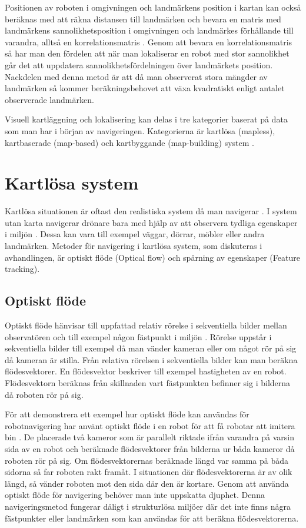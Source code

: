 Positionen av roboten i omgivningen och landmärkens position i kartan kan också beräknas med att räkna distansen till landmärken och bevara en matris med landmärkens sannolikhetsposition i omgivningen och landmärkes förhållande till varandra, alltså en korrelationsmatris \citep{realslamproblem, ProbabilisticRobotics}. Genom att bevara en korrelationsmatris så har man den fördelen att när man lokaliserar en robot med stor sannolikhet går det att uppdatera sannolikhetsfördelningen över landmärkets position. Nackdelen med denna metod är att då man observerat stora mängder av landmärken så kommer beräkningsbehovet att växa kvadratiskt enligt antalet observerade landmärken. 

Visuell kartläggning och lokalisering kan delas i tre kategorier baserat på data som man har i början av navigeringen. Kategorierna är kartlösa (mapless), kartbaserade (map-based) och kartbyggande (map-building) system \citep{geospatial}. 

\section{Kartlösa system}

Kartlösa situationen är oftast den realistiska system då man navigerar \citep{ProbabilisticRobotics}. I system utan karta navigerar drönare bara med hjälp av att observera tydliga egenskaper i miljön \citep{982903}. Dessa kan vara till exempel väggar, dörrar, möbler eller andra landmärken. Metoder för navigering i kartlösa system, som diskuteras i avhandlingen, är optiskt flöde (Optical flow) och spårning av egenskaper (Feature tracking). 

\subsection{Optiskt flöde}

Optiskt flöde hänvisar till uppfattad relativ rörelse i sekventiella bilder mellan observatören och till exempel någon fästpunkt i miljön \citep{opticalflowuav}. Rörelse uppstår i sekventiella bilder till exempel då man vänder kameran eller om något rör på sig då kameran är stilla. Från relativa rörelsen i sekventiella bilder kan man beräkna flödesvektorer. En flödesvektor beskriver till exempel hastigheten av en robot. Flödesvektorn beräknas från skillnaden vart fästpunkten befinner sig i bilderna då roboten rör på sig.

För att demonstrera ett exempel hur optiskt flöde kan användas för robotnavigering har \cite{341094} använt optiskt flöde i en robot för att få robotar att imitera bin \citep{341094}. De placerade två kameror som är parallelt riktade ifrån varandra på varsin sida av en robot och beräknade flödesvektorer från bilderna ur båda kameror då roboten rör på sig. Om flödesvektorernas beräknade längd var samma på båda sidorna så far roboten rakt framåt. I situationen där flödesvektorerna är av olik längd, så vänder roboten mot den sida där den är kortare. Genom att använda optiskt flöde för navigering behöver man inte uppskatta djuphet. Denna navigeringsmetod fungerar dåligt i strukturlösa miljöer där det inte finns några fästpunkter eller landmärken som kan användas för att beräkna flödesvektorerna.

